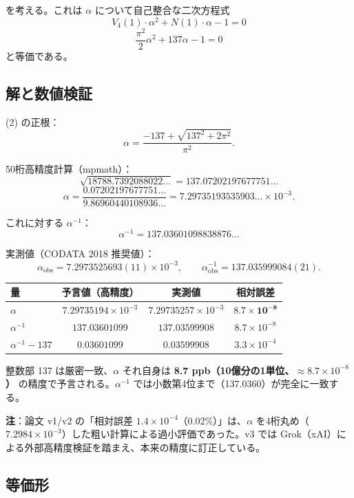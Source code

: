 \documentclass[a4paper,11pt]{ltjsarticle}
\begin{document}
を考える。これは $\alpha$ について自己整合な二次方程式
\begin{equation}
V_4(1) \cdot \alpha^2 + N(1) \cdot \alpha - 1 = 0 \tag{2}
\end{equation}
\[ \frac{\pi^2}{2}\alpha^2 + 137 \alpha - 1 = 0 \]
と等価である。

\subsection{解と数値検証}

(2) の正根：
\[ \alpha = \frac{-137 + \sqrt{137^2 + 2\pi^2}}{\pi^2}. \]

50桁高精度計算（mpmath）：
\[ \sqrt{18788.7392088022\ldots} = 137.07202197677751\ldots \]
\[ \alpha = \frac{0.07202197677751\ldots}{9.86960440108936\ldots} = 7.29735193535903\ldots \times 10^{-3}. \]

これに対する $\alpha^{-1}$：
\[ \alpha^{-1} = 137.03601098838876\ldots \]

実測値（CODATA 2018 推奨値）：
\[ \alpha_{\text{obs}} = 7.2973525693(11) \times 10^{-3}, \qquad \alpha_{\text{obs}}^{-1} = 137.035999084(21). \]

\begin{center}
\begin{tabular}{lccc}
\toprule
量 & 予言値（高精度） & 実測値 & 相対誤差 \\
\midrule
$\alpha$ & $7.29735194 \times 10^{-3}$ & $7.29735257 \times 10^{-3}$ & $\mathbf{8.7 \times 10^{-8}}$ \\
$\alpha^{-1}$ & $137.03601099$ & $137.03599908$ & $8.7 \times 10^{-8}$ \\
$\alpha^{-1} - 137$ & $0.03601099$ & $0.03599908$ & $3.3 \times 10^{-4}$ \\
\bottomrule
\end{tabular}
\end{center}

整数部 137 は厳密一致、$\alpha$ それ自身は \textbf{8.7 ppb（10億分の1単位、$\approx 8.7 \times 10^{-8}$）} の精度で予言される。$\alpha^{-1}$ では小数第4位まで（137.0360）が完全に一致する。

\textbf{注}：論文 v1/v2 の「相対誤差 $1.4 \times 10^{-4}$（0.02\%）」は、$\alpha$ を4桁丸め（$7.2984 \times 10^{-3}$）した粗い計算による過小評価であった。v3 では Grok（xAI）による外部高精度検証を踏まえ、本来の精度に訂正している。

\subsection{等価形}
\end{document}

